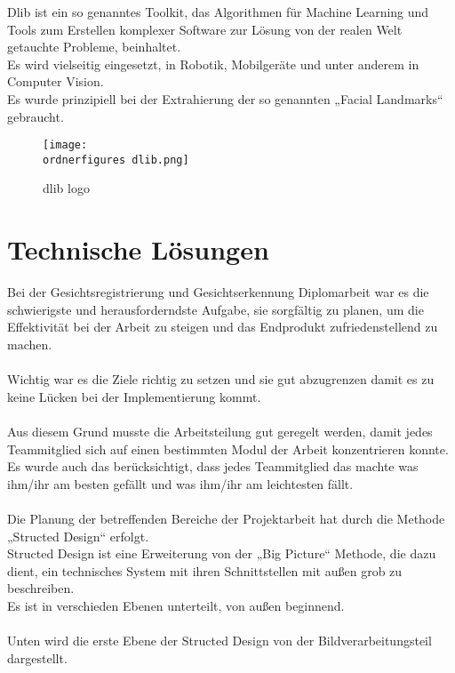Dlib ist ein so genanntes Toolkit, das Algorithmen für Machine Learning und Tools zum Erstellen komplexer Software zur Lösung von der realen Welt getauchte Probleme, beinhaltet.\\
Es wird vielseitig eingesetzt, in Robotik, Mobilgeräte und unter anderem in Computer Vision.\cite{dlib} \\
Es wurde prinzipiell bei der Extrahierung der so genannten „Facial Landmarks“ gebraucht. 

\begin{figure}
	\centering
	\texttt{[image: \\ordnerfigures dlib.png]}
	\caption{ dlib logo \cite{dlib}}
	\label{fig:dlib logo}
\end{figure}


\section{Technische Lösungen}

Bei der Gesichtsregistrierung und Gesichtserkennung Diplomarbeit war es die schwierigste und herausforderndste Aufgabe, sie sorgfältig zu planen, um die Effektivität bei der Arbeit zu steigen und das Endprodukt zufriedenstellend zu machen. \\
 \\
Wichtig war es die Ziele richtig zu setzen und sie gut abzugrenzen damit es zu keine Lücken bei der Implementierung kommt. \\\\
Aus diesem Grund musste die Arbeitsteilung gut geregelt werden, damit jedes Teammitglied sich auf einen bestimmten Modul der Arbeit konzentrieren konnte.\\
Es wurde auch das berücksichtigt, dass jedes Teammitglied das machte was ihm/ihr am besten gefällt und was ihm/ihr am leichtesten fällt. \\ \\
Die Planung der betreffenden Bereiche der Projektarbeit hat durch die Methode „Structed Design“ erfolgt. \\
Structed Design ist eine Erweiterung von der „Big Picture“ Methode, die dazu dient, ein technisches System mit ihren Schnittstellen mit außen grob zu beschreiben. \\
Es ist in verschieden Ebenen unterteilt, von außen beginnend. \\ \\
Unten wird die erste Ebene der Structed Design von der Bildverarbeitungsteil dargestellt. \\

